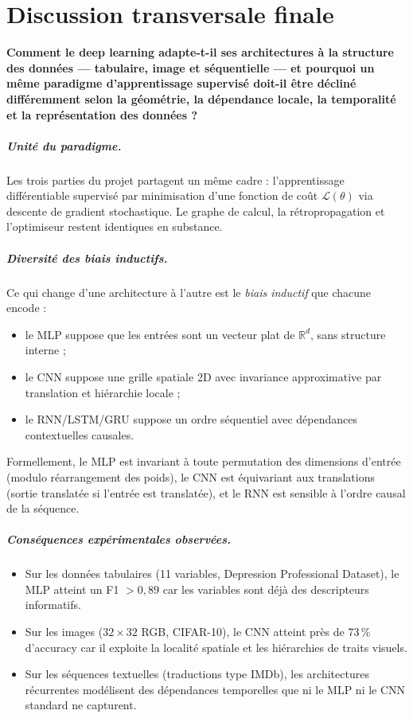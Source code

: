 \chapter{Discussion transversale finale}

\textbf{Comment le deep learning adapte-t-il ses architectures à la structure
des données --- tabulaire, image et séquentielle --- et pourquoi un même
paradigme d'apprentissage supervisé doit-il être décliné différemment selon la
géométrie, la dépendance locale, la temporalité et la représentation des
données ?}

\paragraph{Unité du paradigme.}
Les trois parties du projet partagent un même cadre : l'apprentissage
différentiable supervisé par minimisation d'une fonction de coût
$\mathcal{L}(\theta)$ via descente de gradient stochastique. Le graphe de
calcul, la rétropropagation et l'optimiseur restent identiques en substance.

\paragraph{Diversité des biais inductifs.}
Ce qui change d'une architecture à l'autre est le \emph{biais inductif} que
chacune encode :
\begin{itemize}
    \item le MLP suppose que les entrées sont un vecteur plat de
          $\mathbb{R}^d$, sans structure interne ;
    \item le CNN suppose une grille spatiale 2D avec invariance approximative
          par translation et hiérarchie locale ;
    \item le RNN/LSTM/GRU suppose un ordre séquentiel avec dépendances
          contextuelles causales.
\end{itemize}
Formellement, le MLP est invariant à toute permutation des dimensions d'entrée
(modulo réarrangement des poids), le CNN est équivariant aux translations
(sortie translatée si l'entrée est translatée), et le RNN est sensible à
l'ordre causal de la séquence.

\paragraph{Conséquences expérimentales observées.}
\begin{itemize}
    \item Sur les données tabulaires (11 variables, Depression Professional Dataset), le MLP
          atteint un F1 $> 0{,}89$ car les variables sont déjà des descripteurs
          informatifs.
    \item Sur les images ($32 \times 32$ RGB, CIFAR-10), le CNN 
          atteint près de 73\,\% d'accuracy car il exploite la localité
          spatiale et les hiérarchies de traits visuels.
    \item Sur les séquences textuelles (traductions type IMDb), les architectures récurrentes
          modélisent des dépendances temporelles que ni le MLP ni le CNN
          standard ne capturent.
\end{itemize}

